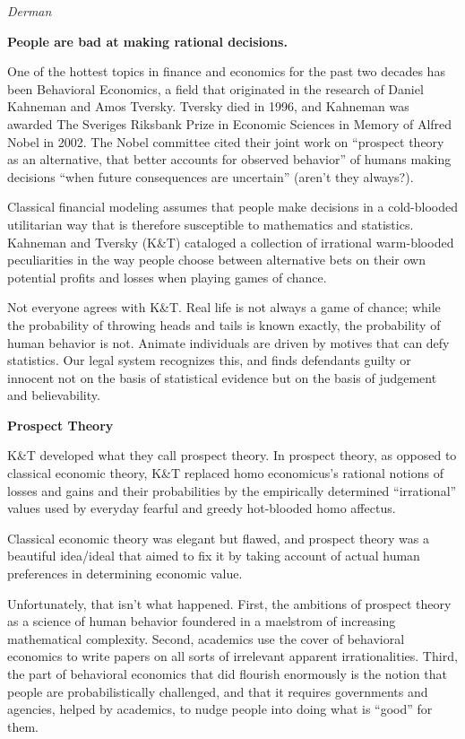 \documentclass[
]{book}
\begin{document}
\emph{Derman}

\textbf{People are bad at making rational decisions.}

One of the hottest topics in finance and economics for the past two decades has been Behavioral
Economics, a field that originated in the research of Daniel Kahneman and Amos Tversky.
Tversky died in 1996, and Kahneman was awarded The Sveriges Riksbank Prize in Economic
Sciences in Memory of Alfred Nobel in 2002. The Nobel committee cited their joint work on
``prospect theory as an alternative, that better accounts for observed behavior'' of humans making
decisions ``when future consequences are uncertain'' (aren't they always?).

Classical financial modeling assumes that people make decisions in a cold-blooded utilitarian way
that is therefore susceptible to mathematics and statistics. Kahneman and Tversky (K\&T) cataloged
a collection of irrational warm-blooded peculiarities in the way people choose between alternative
bets on their own potential profits and losses when playing games of chance.

Not everyone agrees with K\&T. Real life is not always a game of chance; while the probability of
throwing heads and tails is known exactly, the probability of human behavior is not.
Animate
individuals are driven by motives that can defy statistics. Our legal system recognizes this, and finds
defendants guilty or innocent not on the basis of statistical evidence but on the basis of judgement
and believability.

\textbf{Prospect Theory}

K\&T developed what they call prospect theory. In
prospect theory, as opposed to classical economic theory, K\&T replaced homo economicus's rational
notions of losses and gains and their probabilities by the empirically determined ``irrational'' values
used by everyday fearful and greedy hot-blooded homo affectus.

Classical economic theory was elegant but flawed, and prospect theory was a beautiful idea/ideal
that aimed to fix it by taking account of actual human preferences in determining economic value.

Unfortunately, that isn't what happened. First, the ambitions of prospect theory as a science of
human behavior foundered in a maelstrom of increasing mathematical complexity. Second,
academics use the cover of behavioral economics to write papers on all sorts of irrelevant apparent
irrationalities. Third, the part of behavioral economics that did flourish enormously is the notion
that people are probabilistically challenged, and that it requires governments and agencies, helped
by academics, to nudge people into doing what is ``good'' for them.
\end{document}
